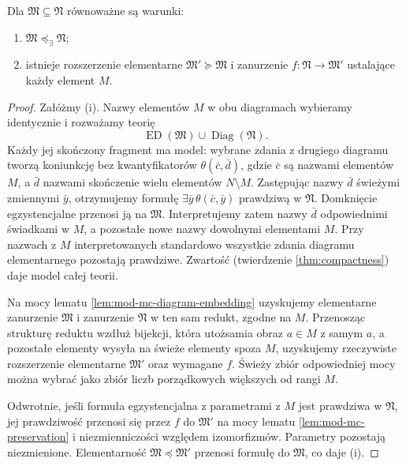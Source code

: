 \begin{lemat}
\label{lem:mod-mc-robinson-diagram}
Dla $\mathfrak M\subseteq\mathfrak N$ równoważne są warunki:
\begin{enumerate}[label=(\roman*)]
\item $\mathfrak M\preccurlyeq_{\exists}\mathfrak N$;
\item istnieje rozszerzenie elementarne
$\mathfrak M'\succeq\mathfrak M$ i zanurzenie
$f:\mathfrak N\to\mathfrak M'$ ustalające każdy element $M$.
\end{enumerate}
\end{lemat}
\begin{proof}
Załóżmy (i). Nazwy elementów $M$ w obu diagramach
wybieramy identycznie i rozważamy teorię
\[
\operatorname{ED}(\mathfrak M)
\cup\operatorname{Diag}(\mathfrak N).
\]
Każdy jej skończony fragment ma model: wybrane zdania
z drugiego diagramu tworzą koniunkcję bez kwantyfikatorów
$\theta(\bar c,\bar d)$, gdzie $\bar c$ są nazwami
elementów $M$, a $\bar d$ nazwami skończenie wielu
elementów $N\setminus M$. Zastępując nazwy $\bar d$
świeżymi zmiennymi $\bar y$, otrzymujemy formułę
$\exists\bar y\,\theta(\bar c,\bar y)$ prawdziwą
w $\mathfrak N$. Domknięcie egzystencjalne przenosi
ją na $\mathfrak M$. Interpretujemy zatem nazwy
$\bar d$ odpowiednimi świadkami w $M$, a pozostałe
nowe nazwy dowolnymi elementami $M$.
Przy nazwach z $M$ interpretowanych standardowo
wszystkie zdania diagramu elementarnego pozostają
prawdziwe. Zwartość (twierdzenie \ref{thm:compactness})
daje model całej teorii.

Na mocy lematu \ref{lem:mod-mc-diagram-embedding}
uzyskujemy elementarne zanurzenie $\mathfrak M$ i
zanurzenie $\mathfrak N$ w ten sam redukt, zgodne na $M$.
Przenosząc strukturę reduktu wzdłuż bijekcji, która
utożsamia obraz $a\in M$ z samym $a$, a pozostałe
elementy wysyła na świeże elementy spoza $M$, uzyskujemy
rzeczywiste rozszerzenie elementarne $\mathfrak M'$
oraz wymagane $f$. Świeży zbiór odpowiedniej mocy
można wybrać jako zbiór liczb porządkowych większych
od rangi $M$.

Odwrotnie, jeśli formuła egzystencjalna z parametrami
z $M$ jest prawdziwa w $\mathfrak N$, jej prawdziwość
przenosi się przez $f$ do $\mathfrak M'$ na mocy
lematu \ref{lem:mod-mc-preservation} i niezmienniczości
względem izomorfizmów. Parametry pozostają niezmienione.
Elementarność $\mathfrak M\preccurlyeq\mathfrak M'$
przenosi formułę do $\mathfrak M$, co daje (i).
\end{proof}

